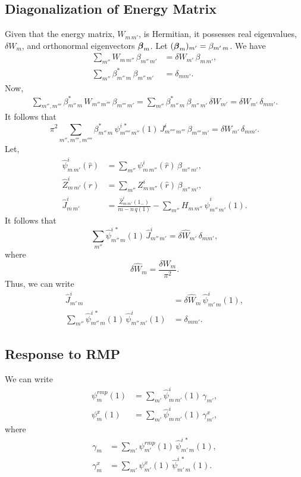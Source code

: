 \documentclass[12pt,prb,aps,notitlepage]{revtex4-1}
\newcommand{\bbeta}{\mbox{\boldmath$\beta$}}
\begin{document}
\subsection{Diagonalization of Energy Matrix}
Given that the energy matrix, $W_{m\,m'}$, is Hermitian, it possesses real eigenvalues, $\delta W_m$, and orthonormal
eigenvectors $\bbeta_m$. Let $(\bbeta_m)_{m'} = \beta_{m'\,m}$. 
We have
\begin{align}
\sum_{m''} W_{m\,m''}\,\beta_{m''\,m'} &= \delta W_{m'}\,\beta_{m\,m'},\\[0.5ex]
\sum_{m''} \beta_{m''\,m}^\ast\,\beta_{m''\,m'} &= \delta_{mm'}.
\end{align}
Now,
\begin{align}
\sum_{m'',m'''}\beta^\ast_{m''\,m}\,W_{m''\,m'''}\,\beta_{m'''\,m'} = \sum_{m''} \beta^\ast_{m''\,m}\,\beta_{m''\,m'}\,\delta W_{m'}=\delta W_{m'}\,\delta_{mm'}.
\end{align}
It follows that
\begin{equation}
\pi^2\sum_{m'',m''',m''''}\beta^\ast_{m''\,m}\,\psi^{i\,\ast}_{m''''\,m''}(1)\,J^i_{m''''\,m'''}\,\beta_{m'''\,m'} = \delta W_{m'}\,\delta_{mm'}.
\end{equation}
Let,
\begin{align}
\hat{\psi}^i_{m\,m'}(\hat{r}) &= \sum_{m''}\psi^i_{m\,m''}(\hat{r})\,\beta_{m''\,m'},\\[0.5ex]
\hat{Z}^i_{m\,m'}(\hat{r}) &= \sum_{m''}Z^i_{m\,m''}(\hat{r})\,\beta_{m''\,m'},\\[0.5ex]
\hat{J}^i_{m\,m'} &=  \frac{\hat{Z}_{m\,m'}^i(1_-)}{m-n\,q(1)}-\sum_{m''} H_{m\,m''}\,\hat{\psi}_{m''\,m'}^i(1).
\end{align}
It follows that
\begin{equation}
\sum_{m''} \hat{\psi}^{i\,\ast}_{m''\,m}(1)\,\hat{J}^i_{m''\,m'} = \delta\hat{W}_{m'}\,\delta_{mm'},
\end{equation}
where
\begin{equation}
\delta\hat{W}_m = \frac{\delta W_m}{\pi^2}.
\end{equation}
Thus, we can write
\begin{align}
\hat{J}^i_{m'\,m} &= \delta\hat{W}_m\,\hat{\psi}^i_{m'\,m}(1),\\[0.5ex]
\sum_{m'' }\hat{\psi}^{i\,\ast}_{m''\,m}(1)\,\hat{\psi}^i_{m''\,m'}(1)&=\delta_{mm'}.
\end{align}

\subsection{Response to RMP}
We can write
\begin{align}
\psi_m^{rmp}(1)&=\sum_{m'} \hat{\psi}^i_{m\,m'}(1)\,\gamma_{m'},\\[0.5ex]
\psi^x_m(1)&=\sum_{m'} \hat{\psi}^i_{m\,m'}(1)\,\gamma_{m'}^x,
\end{align}
where
\begin{align}
\gamma_{m}&= \sum_{m'} \psi_{m'}^{rmp}(1)\,\hat{\psi}_{m'\,m}^{i\,\ast}(1),\\[0.5ex]
\gamma_{m}^x&= \sum_{m'} \psi_{m'}^x(1)\,\hat{\psi}_{m'\,m}^{i\,\ast}(1).
\end{align}
\end{document}
